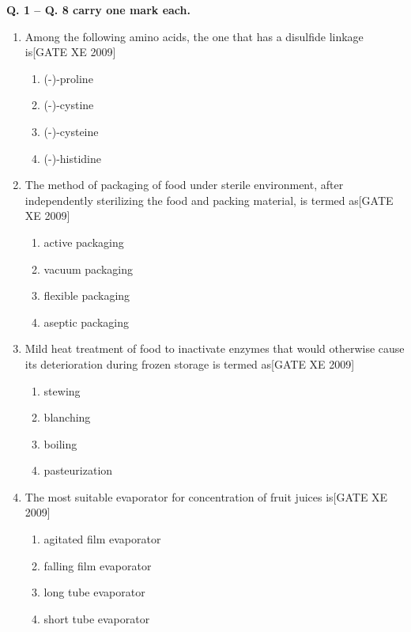 \documentclass[journal,12pt,onecolumn]{IEEEtran}
\theoremstyle{remark}
\begin{document}
 \textbf{Q. 1 -- Q. 8 carry one mark each.}
\begin{enumerate}[label=\textbf{Q.\arabic*.}, wide=0pt, leftmargin=*]


\item Among the following amino acids, the one that has a disulfide linkage is\hfill[GATE XE 2009]
\begin{multicols}{2}
\begin{enumerate}
\item (-)-proline
\item (-)-cystine
\item (-)-cysteine
\item (-)-histidine
\end{enumerate}
\end{multicols}

\item The method of packaging of food under sterile environment, after independently sterilizing the food and packing material, is termed as\hfill[GATE XE 2009]
\begin{multicols}{2}
\begin{enumerate}
\item active packaging
\item vacuum packaging
\item flexible packaging
\item aseptic packaging
\end{enumerate}
\end{multicols}

\item Mild heat treatment of food to inactivate enzymes that would otherwise cause its deterioration during frozen storage is termed as\hfill[GATE XE 2009]
\begin{multicols}{2}
\begin{enumerate}
\item stewing
\item blanching
\item boiling
\item pasteurization
\end{enumerate}
\end{multicols}

\item The most suitable evaporator for concentration of fruit juices is\hfill[GATE XE 2009]
\begin{multicols}{2}
\begin{enumerate}
\item agitated film evaporator
\item falling film evaporator
\item long tube evaporator
\item short tube evaporator
\end{enumerate}
\end{multicols}


\end{enumerate}
\end{document}
